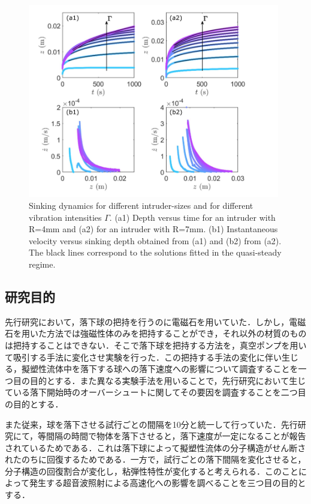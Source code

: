 \begin{center}
    \newpage
    \begin{figure}[h]
        \centering
        \includegraphics[width=11.0cm,clip]{1-Background/4-sinking.png}
        \caption{Sinking dynamics for different intruder-sizes and for different vibration intensities $\Gamma$. (a1) Depth versus time for an intruder with R=4mm and (a2) for an intruder with R=7mm. (b1) Instantaneous velocity versus sinking depth obtained from (a1) and (b2) from (a2). The black lines correspond to the solutions fitted in the quasi-steady regime\cite{ref:6}.}
        \label{fig:4-sinking}
    \end{figure}
\end{center}

\subsection{研究目的}

先行研究\cite{ref:8}において，落下球の把持を行うのに電磁石を用いていた．しかし，電磁石を用いた方法では強磁性体のみを把持することができ，それ以外の材質のものは把持することはできない．そこで落下球を把持する方法を，真空ポンプを用いて吸引する手法に変化させ実験を行った．この把持する手法の変化に伴い生じる，擬塑性流体中を落下する球への落下速度への影響について調査することを一つ目の目的とする．また異なる実験手法を用いることで，先行研究において生じている落下開始時のオーバーシュートに関してその要因を調査することを二つ目の目的とする．

また従来，球を落下させる試行ごとの間隔を10分と統一して行っていた．先行研究\cite{ref:8-5}にて，等間隔の時間で物体を落下させると，落下速度が一定になることが報告されているためである．これは落下球によって擬塑性流体の分子構造がせん断されたのちに回復するためである．一方で，試行ごとの落下間隔を変化させると，分子構造の回復割合が変化し，粘弾性特性が変化すると考えられる．このことによって発生する超音波照射による高速化への影響を調べることを三つ目の目的とする．
